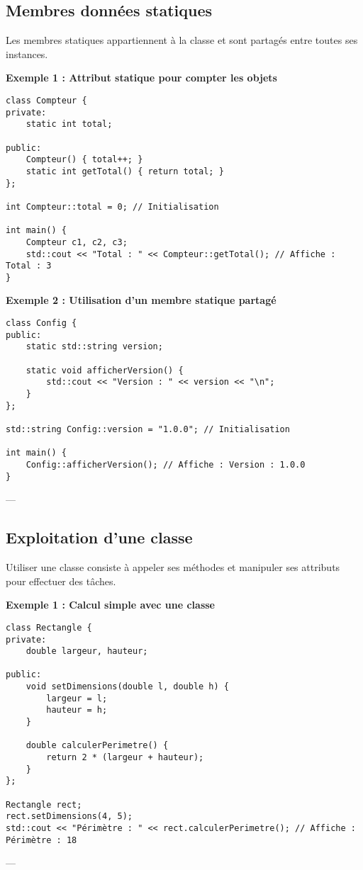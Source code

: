 \subsection{ Membres données statiques}
Les membres statiques appartiennent à la classe et sont partagés entre toutes ses instances.

\textbf{Exemple 1 : Attribut statique pour compter les objets}
\begin{tcolorbox}[colframe=blue!50!black, colback=blue!5!white, title=Exemple d'Attributs et Méthodes Statistiques, float=htb]
\begin{verbatim}
class Compteur {
private:
    static int total;

public:
    Compteur() { total++; }
    static int getTotal() { return total; }
};

int Compteur::total = 0; // Initialisation

int main() {
    Compteur c1, c2, c3;
    std::cout << "Total : " << Compteur::getTotal(); // Affiche : Total : 3
}
\end{verbatim}
\end{tcolorbox}
\textbf{Exemple 2 : Utilisation d'un membre statique partagé}
\begin{tcolorbox}[colframe=blue!50!black, colback=blue!5!white, title=Exemple d'Attributs et Méthodes Statistiques, float=htb]
\begin{verbatim}
class Config {
public:
    static std::string version;

    static void afficherVersion() {
        std::cout << "Version : " << version << "\n";
    }
};

std::string Config::version = "1.0.0"; // Initialisation

int main() {
    Config::afficherVersion(); // Affiche : Version : 1.0.0
}
\end{verbatim}
\end{tcolorbox}
---

\subsection{ Exploitation d'une classe}
Utiliser une classe consiste à appeler ses méthodes et manipuler ses attributs pour effectuer des tâches.

\textbf{Exemple 1 : Calcul simple avec une classe}
\begin{tcolorbox}[colframe=blue!50!black, colback=blue!5!white, title=Exemple d'Attributs et Méthodes Statistiques, float=htb]
\begin{verbatim}
class Rectangle {
private:
    double largeur, hauteur;

public:
    void setDimensions(double l, double h) {
        largeur = l;
        hauteur = h;
    }

    double calculerPerimetre() {
        return 2 * (largeur + hauteur);
    }
};

Rectangle rect;
rect.setDimensions(4, 5);
std::cout << "Périmètre : " << rect.calculerPerimetre(); // Affiche : Périmètre : 18
\end{verbatim}
\end{tcolorbox}
---

